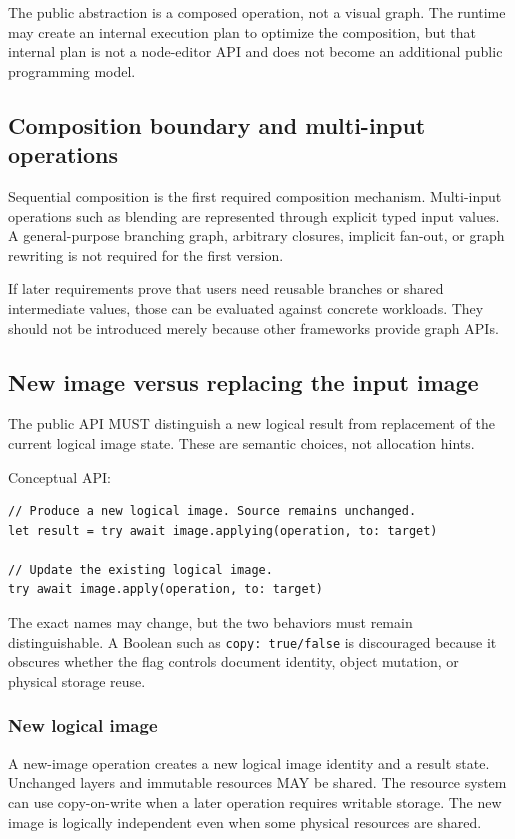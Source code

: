 \documentclass[11pt,a4paper,oneside]{article}
\begin{document}
The public abstraction is a composed operation, not a visual graph. The runtime may create an internal execution plan to optimize the composition, but that internal plan is not a node-editor API and does not become an additional public programming model.

\subsection{Composition boundary and multi-input operations}

Sequential composition is the first required composition mechanism. Multi-input operations such as blending are represented through explicit typed input values. A general-purpose branching graph, arbitrary closures, implicit fan-out, or graph rewriting is not required for the first version.

If later requirements prove that users need reusable branches or shared intermediate values, those can be evaluated against concrete workloads. They should not be introduced merely because other frameworks provide graph APIs.

\subsection{New image versus replacing the input image}

The public API MUST distinguish a new logical result from replacement of the current logical image state. These are semantic choices, not allocation hints.

Conceptual API:
\begin{lstlisting}
// Produce a new logical image. Source remains unchanged.
let result = try await image.applying(operation, to: target)

// Update the existing logical image.
try await image.apply(operation, to: target)
\end{lstlisting}

The exact names may change, but the two behaviors must remain distinguishable. A Boolean such as \texttt{copy: true/false} is discouraged because it obscures whether the flag controls document identity, object mutation, or physical storage reuse.

\subsubsection{New logical image}

A new-image operation creates a new logical image identity and a result state. Unchanged layers and immutable resources MAY be shared. The resource system can use copy-on-write when a later operation requires writable storage. The new image is logically independent even when some physical resources are shared.
\end{document}

